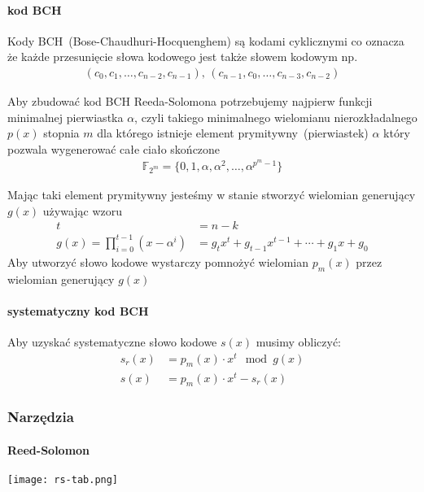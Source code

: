 \paragraph{kod BCH}

Kody BCH~(Bose-Chaudhuri-Hocquenghem) są kodami cyklicznymi co oznacza że każde przesunięcie słowa kodowego jest także słowem kodowym np.
\begin{align*}
    (c_0, c_1,\ldots, c_{n-2}, c_{n-1})\text{, }(c_{n-1}, c_0, \ldots, c_{n-3}, c_{n-2})
\end{align*}

Aby zbudować kod BCH Reeda-Solomona potrzebujemy najpierw funkcji minimalnej pierwiastka $\alpha$, czyli takiego minimalnego wielomianu nierozkładalnego $p(x)$ stopnia $m$ dla którego istnieje element prymitywny~(pierwiastek) $\alpha$ który pozwala wygenerować całe ciało skończone
\begin{align*}
    \mathbb{F}_{2^m} = \{0, 1, \alpha, \alpha^2, \ldots, \alpha^{p^{m}-1} \}
\end{align*}

Mając taki element prymitywny jesteśmy w stanie stworzyć wielomian generujący $g(x)$ używając wzoru
\begin{align*}
    t &= n - k \\
    g(x) = \prod_{i=0}^{t-1} (x - \alpha^i) &= g_{t}x^t + g_{t-1}x^{t-1} +
    \cdots + g_{1}x + g_{0}
\end{align*}
Aby utworzyć słowo kodowe wystarczy pomnożyć wielomian $p_m(x)$ przez wielomian generujący $g(x)$

\paragraph{systematyczny kod BCH}\label{systematic-bch-rs}

Aby uzyskać systematyczne słowo kodowe $s(x)$ musimy obliczyć:
\begin{align*}
    s_r(x) &= p_m(x) \cdot x^t \mod g(x) \\
    s(x) &= p_m(x) \cdot x^t - s_r(x)
\end{align*}

\subsubsection{Narzędzia}
\paragraph{Reed-Solomon}
\texttt{[image: rs-tab.png]}

